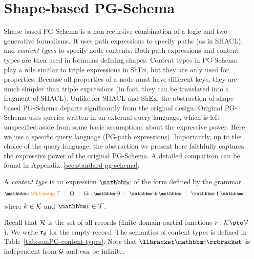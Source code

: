 \section{Shape-based PG-Schema}
\label{sec:pgschema-simplified}

Shape-based PG-Schema is a non-recursive combination of a logic and two generative formalisms. It uses path expressions to specify paths (as in SHACL), and \emph{content types} to specify node contents. Both path expressions and content types are then used in formulas defining shapes.
Content types in PG-Schema play a role similar to triple expressions in ShEx, but they are only used for properties. Because all properties of a node must have different keys, they are much simpler than triple expressions (in fact, they can be translated into a fragment of SHACL). Unlike for SHACL and ShEx, the abstraction of shape-based PG-Schema departs significantly from the original design. Original PG-Schema uses queries written in an external query language,  which is left unspecified aside from some basic assumptions about the expressive power. Here we use a specific query language (PG-path expressions). Importantly, up to the choice of the query language, the abstraction we present here faithfully captures the expressive power of the original PG-Schema. A detailed comparison can be found in Appendix~\ref{sec:standard-pg-schema}.


\begin{definition}
\label{def:contentType}
A \emph{content type} is an expression $\ntype$ of the form defined by the grammar
 $$\ntype \gDef \top \ \gMid \ \closedRT{}\  \gMid\  \closedRT{k : \vtype} \ \gMid\   \ntype \tAnd \ntype  \ \gMid \  \ntype \tOr \ntype  \gEnd$$
where $k \in \mathcal{K}$ and $\vtype \in \ValueTypes$. 
\end{definition}

Recall that $\mathcal{R}$ is the set of all records (finite-domain partial functions $r : \Keys \pto \Values$). We write $\textbf{r}_{\emptyset}$ for the empty record. 
The semantics of content types is defined in Table~\ref{tab:semPG-content-types}. Note that $\sem{\ntype}$ is independent from $\mathcal{G}$ and can be infinite.

